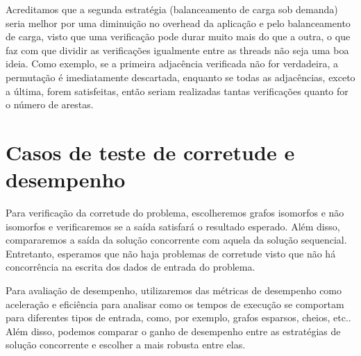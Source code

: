   Acreditamos que a segunda estratégia (balanceamento de carga sob demanda) seria melhor por uma diminuição no overhead da aplicação e pelo balanceamento de carga, visto que uma verificação pode durar muito mais do que a outra, o que faz com que dividir as verificações igualmente entre as threads não seja uma boa ideia. Como exemplo, se a primeira adjacência verificada não for verdadeira, a permutação é imediatamente descartada, enquanto se todas as adjacências, exceto a última, forem satisfeitas, então seriam realizadas tantas verificações quanto for o número de arestas.


\section{Casos de teste de corretude e desempenho}

  Para verificação da corretude do problema, escolheremos grafos isomorfos e não isomorfos e verificaremos se a saída satisfará o resultado esperado. Além disso, compararemos a saída da solução concorrente com aquela da solução sequencial. Entretanto, esperamos que não haja problemas de corretude visto que não há concorrência na escrita dos dados de entrada do problema.

  Para avaliação de desempenho, utilizaremos das métricas de desempenho como aceleração e eficiência para analisar como os tempos de execução se comportam para diferentes tipos de entrada, como, por exemplo, grafos esparsos, cheios, etc.. Além disso, podemos comparar o ganho de desempenho entre as estratégias de solução concorrente e escolher a mais robusta entre elas.
